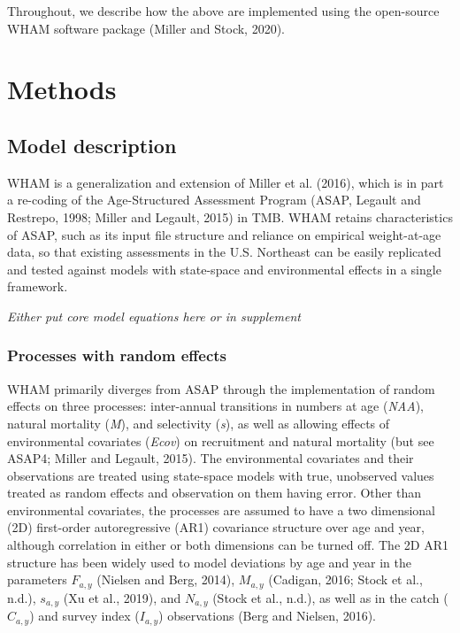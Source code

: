 \documentclass[]{article}
\begin{document}
Throughout, we describe how the above are implemented using the
open-source WHAM software package (Miller and Stock, 2020).

\hypertarget{methods}{%
\section{Methods}\label{methods}}

\hypertarget{model-description}{%
\subsection{Model description}\label{model-description}}

WHAM is a generalization and extension of Miller et al. (2016), which is
in part a re-coding of the Age-Structured Assessment Program (ASAP,
Legault and Restrepo, 1998; Miller and Legault, 2015) in TMB. WHAM
retains characteristics of ASAP, such as its input file structure and
reliance on empirical weight-at-age data, so that existing assessments
in the U.S. Northeast can be easily replicated and tested against models
with state-space and environmental effects in a single framework.

\emph{Either put core model equations here or in supplement}

\hypertarget{processes-with-random-effects}{%
\subsubsection{Processes with random
effects}\label{processes-with-random-effects}}

WHAM primarily diverges from ASAP through the implementation of random
effects on three processes: inter-annual transitions in numbers at age
(\emph{NAA}), natural mortality (\emph{M}), and selectivity (\emph{s}),
as well as allowing effects of environmental covariates (\emph{Ecov}) on
recruitment and natural mortality (but see ASAP4; Miller and Legault,
2015). The environmental covariates and their observations are treated
using state-space models with true, unobserved values treated as random
effects and observation on them having error. Other than environmental
covariates, the processes are assumed to have a two dimensional (2D)
first-order autoregressive (AR1) covariance structure over age and year,
although correlation in either or both dimensions can be turned off. The
2D AR1 structure has been widely used to model deviations by age and
year in the parameters \(F_{a,y}\) (Nielsen and Berg, 2014), \(M_{a,y}\)
(Cadigan, 2016; Stock et al., n.d.), \(s_{a,y}\) (Xu et al., 2019), and
\(N_{a,y}\) (Stock et al., n.d.), as well as in the catch (\(C_{a,y}\))
and survey index (\(I_{a,y}\)) observations (Berg and Nielsen, 2016).
\end{document}
